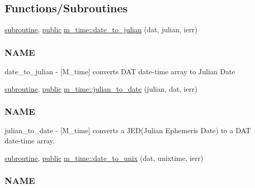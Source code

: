 \subsection*{Functions/\+Subroutines}
\begin{DoxyCompactItemize}
\item 
\hyperlink{M__stopwatch_83_8txt_acfbcff50169d691ff02d4a123ed70482}{subroutine}, \hyperlink{M__stopwatch_83_8txt_a2f74811300c361e53b430611a7d1769f}{public} \hyperlink{namespacem__time_acfdc970b4154b0c15bd33727636e3992}{m\+\_\+time\+::date\+\_\+to\+\_\+julian} (dat, julian, ierr)
\begin{DoxyCompactList}\small\item\em \subsubsection*{N\+A\+ME}

date\+\_\+to\+\_\+julian -\/ \mbox{[}M\+\_\+time\mbox{]} converts D\+AT date-\/time array to Julian Date \end{DoxyCompactList}\item 
\hyperlink{M__stopwatch_83_8txt_acfbcff50169d691ff02d4a123ed70482}{subroutine}, \hyperlink{M__stopwatch_83_8txt_a2f74811300c361e53b430611a7d1769f}{public} \hyperlink{namespacem__time_abb44cf18cd0a3e420c20469efb056203}{m\+\_\+time\+::julian\+\_\+to\+\_\+date} (julian, dat, ierr)
\begin{DoxyCompactList}\small\item\em \subsubsection*{N\+A\+ME}

julian\+\_\+to\+\_\+date -\/ \mbox{[}M\+\_\+time\mbox{]} converts a J\+E\+D(\+Julian Ephemeris Date) to a D\+AT date-\/time array. \end{DoxyCompactList}\item 
\hyperlink{M__stopwatch_83_8txt_acfbcff50169d691ff02d4a123ed70482}{subroutine}, \hyperlink{M__stopwatch_83_8txt_a2f74811300c361e53b430611a7d1769f}{public} \hyperlink{namespacem__time_aed245c691853279ebf0ce899dec9caa9}{m\+\_\+time\+::date\+\_\+to\+\_\+unix} (dat, unixtime, ierr)
\begin{DoxyCompactList}\small\item\em \subsubsection*{N\+A\+ME}


\end{DoxyCompactList}
\end{DoxyCompactItemize}
